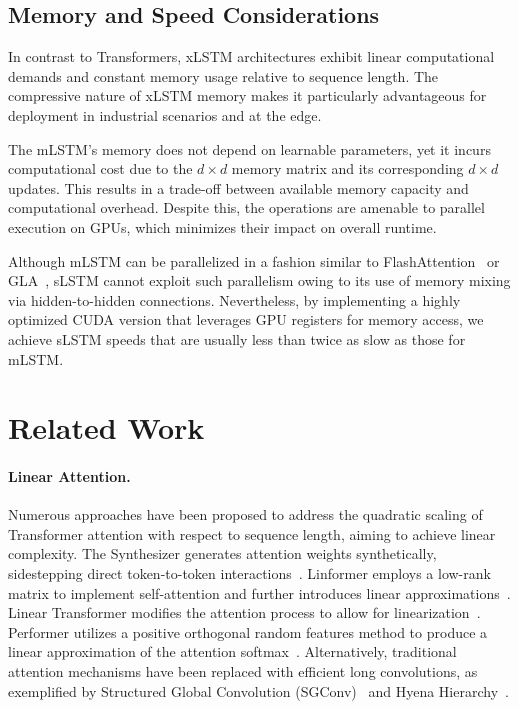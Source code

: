 \subsection{Memory and Speed Considerations}

In contrast to Transformers, xLSTM architectures exhibit linear computational demands and constant memory usage relative to sequence length. The compressive nature of xLSTM memory makes it particularly advantageous for deployment in industrial scenarios and at the edge.

The mLSTM’s memory does not depend on learnable parameters, yet it incurs computational cost due to the $d \times d$ memory matrix and its corresponding $d \times d$ updates. This results in a trade-off between available memory capacity and computational overhead. Despite this, the operations are amenable to parallel execution on GPUs, which minimizes their impact on overall runtime.

Although mLSTM can be parallelized in a fashion similar to FlashAttention~\citep{Dao:22,Dao:23} or GLA~\citep{Yang:23arxiv}, sLSTM cannot exploit such parallelism owing to its use of memory mixing via hidden-to-hidden connections. Nevertheless, by implementing a highly optimized CUDA version that leverages GPU registers for memory access, we achieve sLSTM speeds that are usually less than twice as slow as those for mLSTM.

\section{Related Work}
\label{sec:related}

\paragraph{Linear Attention.} Numerous approaches have been proposed to address the quadratic scaling of Transformer attention with respect to sequence length, aiming to achieve linear complexity. The Synthesizer generates attention weights synthetically, sidestepping direct token-to-token interactions~\citep{Tay:20arxiv}. Linformer employs a low-rank matrix to implement self-attention and further introduces linear approximations~\citep{Wang:20arxiv}. Linear Transformer modifies the attention process to allow for linearization~\citep{Katharopoulos:20}. Performer utilizes a positive orthogonal random features method to produce a linear approximation of the attention softmax~\citep{Choromanski:21}. Alternatively, traditional attention mechanisms have been replaced with efficient long convolutions, as exemplified by Structured Global Convolution (SGConv)~\citep{Li:22} and Hyena Hierarchy~\citep{Poli:23}.


